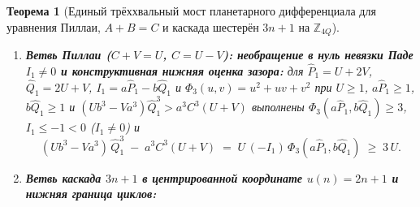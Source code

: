 \documentclass[11pt,a4paper]{article}
\theoremstyle{plain}
\newtheorem{theorem}{Теорема}[section]
\theoremstyle{definition}
\begin{document}
\begin{theorem}[Единый трёххвальный мост планетарного дифференциала для уравнения Пиллаи, $A+B=C$ и каскада шестерён $3n+1$ на $\mathbb{Z}_{4Q}$]
\begin{enumerate}[label=\textbf{(\roman*)},leftmargin=*]
  на фундаментальном домене круга $0 \le \alpha \le \widetilde{A}X - 1$ ($\widetilde{B}^2\widetilde{C}Y^2 Z > 0$) тождество $(\widetilde{B}Y)C + (\widetilde{B}^2\widetilde{C})(Y^2 Z)\alpha = R_{\mathrm{full}}\beta$ зажимает $(\widetilde{B}Y)C$ в двустороннюю целочисленную вилку
  \[
    R_{\mathrm{full}}\,\beta \;-\; (\widetilde{B}^2\widetilde{C})(Y^2 Z)(\widetilde{A}X - 1) \;\le\; (\widetilde{B}Y)\,C \;\le\; R_{\mathrm{full}}\,\beta
  \]
  (со строгой верхней границей $(\widetilde{B}Y)C < R_{\mathrm{full}}\beta$ при $\alpha \ge 1$).
\item \textbf{Ветвь Пиллаи ($C + V = U$, $C = U - V$): необращение в нуль невязки Паде $I_1 \ne 0$ и конструктивная нижняя оценка зазора:}
  для $\widehat{P}_1 = U+2V$, $\widehat{Q}_1 = 2U+V$, $I_1 = a\widehat{P}_1 - b\widehat{Q}_1$ и $\Phi_3(u,v) = u^2+uv+v^2$ при $U\ge 1$, $a\widehat{P}_1\ge 1$, $b\widehat{Q}_1\ge 1$ и $(U b^3 - V a^3)\widehat{Q}_1^3 > a^3 C^3(U+V)$ выполнены $\Phi_3(a\widehat{P}_1,b\widehat{Q}_1)\ge 3$, $I_1 \le -1 < 0$ ($I_1\ne 0$) и
  \[
    (U b^3 - V a^3)\,\widehat{Q}_1^3 \;-\; a^3 C^3(U + V) \;=\; U\,(-I_1)\,\Phi_3(a\widehat{P}_1, b\widehat{Q}_1) \;\ge\; 3\,U.
  \]
\item \textbf{Ветвь каскада $3n+1$ в центрированной координате $u(n) = 2n+1$ и нижняя граница циклов:}

\end{enumerate}
\end{theorem}
\end{document}
